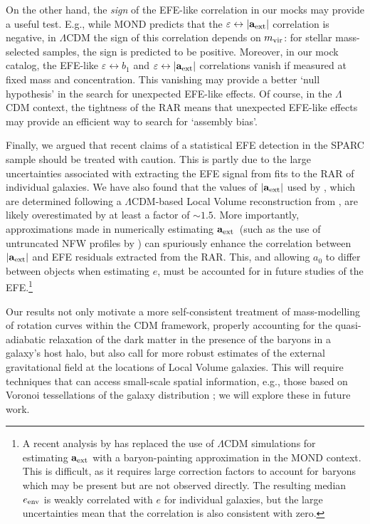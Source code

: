 \documentclass[usenatbib]{mnras}
\newcommand{\aext}{\ensuremath{\mathbf{a}_{\rm ext}}}
\begin{document}
On the other hand, the {\em sign} of the EFE-like correlation in our mocks may provide a useful test.  E.g., while MOND predicts that the $\varepsilon\leftrightarrow |\aext|$ correlation is negative, in $\Lambda$CDM the sign of this correlation depends on $m_{\rm vir}$: for stellar mass-selected samples, the sign is predicted to be positive. Moreover, in our mock catalog, the EFE-like $\varepsilon\leftrightarrow b_1$ and $\varepsilon\leftrightarrow |\aext|$ correlations vanish if measured at fixed mass and concentration. This vanishing may provide a better `null hypothesis' in the search for unexpected EFE-like effects.  Of course, in the $\Lambda$CDM context, the tightness of the RAR means that unexpected EFE-like effects may provide an efficient way to search for `assembly bias'.

Finally, we argued that recent claims  of a statistical EFE detection in the SPARC sample should be treated with caution. This is partly due to the large uncertainties associated with extracting the EFE signal from fits to the RAR of individual galaxies. We have also found that the values of $|\aext|$ used by , which are determined following a $\Lambda$CDM-based Local Volume reconstruction from , are likely overestimated by at least a factor of $\sim1.5$.
More importantly, approximations made in numerically estimating \aext\ (such as the use of untruncated NFW profiles by ) can spuriously enhance the correlation between $|\aext|$ and EFE residuals extracted from the RAR. This, and allowing $a_0$ to differ between objects when estimating $e$, must be accounted for in future studies of the EFE.\footnote{A recent analysis by \citet{efe21} has replaced the use of $\Lambda$CDM simulations for estimating $\aext$ with a baryon-painting approximation in the MOND context. This is difficult, as it requires large correction factors to account for baryons which may be present but are not observed directly.  The resulting median $e_{\rm env}$ is weakly correlated with $e$ for individual galaxies, but the large uncertainties mean that the correlation is also consistent with zero.} 

Our results not only motivate a more self-consistent treatment of mass-modelling of rotation curves within the CDM framework, properly accounting for the quasi-adiabatic relaxation of the dark matter in the presence of the baryons in a galaxy's host halo, but also call for more robust estimates of the external gravitational field at the locations of Local Volume galaxies. This will require techniques that can access small-scale spatial information, e.g., those based on Voronoi tessellations of the galaxy distribution \citep{pa20}; we will explore these in future work.
\end{document}
